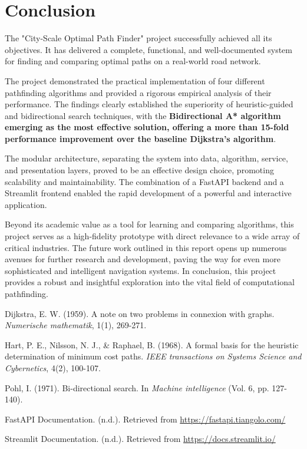 \documentclass[12pt, a4paper]{report}
\begin{document}
\clearpage
\chapter{Conclusion}

The "City-Scale Optimal Path Finder" project successfully achieved all its objectives. It has delivered a complete, functional, and well-documented system for finding and comparing optimal paths on a real-world road network.

The project demonstrated the practical implementation of four different pathfinding algorithms and provided a rigorous empirical analysis of their performance. The findings clearly established the superiority of heuristic-guided and bidirectional search techniques, with the \textbf{Bidirectional A* algorithm emerging as the most effective solution, offering a more than 15-fold performance improvement over the baseline Dijkstra's algorithm}.

The modular architecture, separating the system into data, algorithm, service, and presentation layers, proved to be an effective design choice, promoting scalability and maintainability. The combination of a FastAPI backend and a Streamlit frontend enabled the rapid development of a powerful and interactive application.

Beyond its academic value as a tool for learning and comparing algorithms, this project serves as a high-fidelity prototype with direct relevance to a wide array of critical industries. The future work outlined in this report opens up numerous avenues for further research and development, paving the way for even more sophisticated and intelligent navigation systems. In conclusion, this project provides a robust and insightful exploration into the vital field of computational pathfinding.

\clearpage
\begin{thebibliography}{9}
    Dijkstra, E. W. (1959). A note on two problems in connexion with graphs. \textit{Numerische mathematik}, 1(1), 269-271.
    
    Hart, P. E., Nilsson, N. J., \& Raphael, B. (1968). A formal basis for the heuristic determination of minimum cost paths. \textit{IEEE transactions on Systems Science and Cybernetics}, 4(2), 100-107.
    
    Pohl, I. (1971). Bi-directional search. In \textit{Machine intelligence} (Vol. 6, pp. 127-140).
    
    FastAPI Documentation. (n.d.). Retrieved from \url{https://fastapi.tiangolo.com/}
    
    Streamlit Documentation. (n.d.). Retrieved from \url{https://docs.streamlit.io/}
\end{thebibliography}
\end{document}
